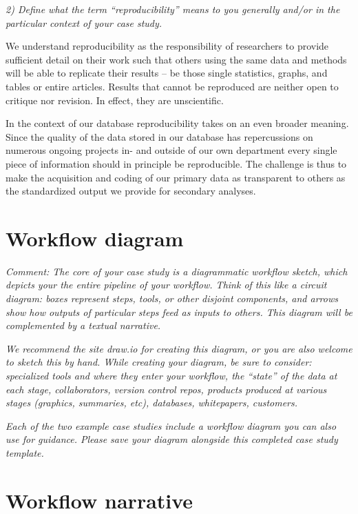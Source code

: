 \documentclass[
  11pt
]{article}
\begin{document}
\textit{2) Define what the term ``reproducibility'' means to you generally and/or in the particular context of your case study.}

We understand reproducibility as the responsibility of
researchers to provide sufficient detail on their work
such that others using the same data and methods will be
able to replicate their results -- be those single statistics, 
graphs, and tables or entire articles. Results that cannot be 
reproduced are neither open to critique nor revision. In
effect, they are unscientific.

In the context of our database reproducibility takes on an
even broader meaning. Since the quality of the data
stored in our database has repercussions on numerous
ongoing projects in- and outside of our own department every
single piece of information should in principle be
reproducible. The challenge is thus to make the acquisition
and coding of our primary data as transparent to others
as the standardized output we provide for secondary
analyses.

\section{Workflow diagram}
\textit{Comment: The core of your case study is a diagrammatic workflow sketch, which depicts your the entire pipeline of your workflow. Think of this like a circuit diagram: boxes represent steps, tools, or other disjoint components, and arrows show how outputs of particular steps feed as inputs to others. This diagram will be complemented by a textual narrative.}

\noindent
\textit{We recommend the site draw.io for creating this diagram, or you are also welcome to sketch this by hand. While creating your diagram, be sure to consider: specialized tools and where they enter your workflow, the ``state'' of the data at each stage, collaborators, version control repos, products produced at various stages (graphics, summaries, etc), databases, whitepapers, customers.}

\noindent
\textit{Each of the two example case studies include a workflow diagram you can also use for guidance. Please save your diagram alongside this completed case study template.}



\section{Workflow narrative}
\end{document}
